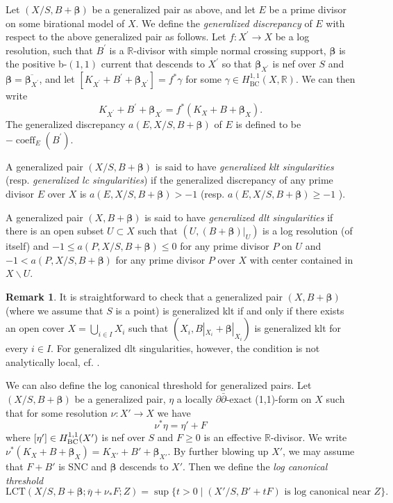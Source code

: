 \documentclass[11pt]{amsart}
\numberwithin{equation}{section}
\def\bbeta{\boldsymbol{\beta}}
\theoremstyle{definition}
\theoremstyle{definition}
\theoremstyle{definition}
\newtheorem{remark}[theorem]{Remark}
\begin{document}
Let $(X{ /S}, B+\bbeta)$ be a generalized pair as above, and let $E$ be a prime divisor on some birational model of $X$. We define the \textit{generalized discrepancy} of $E$ with respect to the above generalized pair as follows. Let $f: X^{\prime} \rightarrow X$ be a log resolution, such that $B^{\prime}$ is a $\mathbb{R}$-divisor with simple normal crossing support, $\boldsymbol{\beta}$ is the positive b-$(1,1)$ current that descends to $X^{\prime}$ so that $\boldsymbol{\beta}_{X^{\prime}}$ is nef over $S$ and $\boldsymbol{\beta}=\overline{\boldsymbol{\beta}_{X^{\prime}}}$, and let $\left[K_{X^{\prime}}+B^{\prime}+\boldsymbol{\beta}_{X^{\prime}}\right]=f^* \gamma$ for some $\gamma \in H_{\mathrm{BC}}^{1,1}(X, \mathbb{R})$. We can then write
$$
K_{X^{\prime}}+B^{\prime}+\boldsymbol{\beta}_{X^{\prime}}=f^*\left(K_X+B+\boldsymbol{\beta}_X\right) .
$$
The generalized discrepancy $a(E,X{/S}, B+ \boldsymbol{\beta})$ of $E$ is defined to be $-\operatorname{coeff}_E\left(B^{\prime}\right)$.

A generalized pair $(X{/S}, B+\bbeta)$ is said to have \textit{generalized klt singularities} (resp. \textit{generalized lc singularities}) if the generalized discrepancy of any prime divisor $E$ over $X$ is $a(E, X{/S}, B+ \boldsymbol{\beta})>-1$ (resp. $a(E, X{/S}, B+ \boldsymbol{\beta}) \geq-1$ ).

A generalized pair $(X, B+\boldsymbol{\beta})$ is said to have \textit{generalized dlt singularities}  if there is an open subset $U \subset X$ such that $\left(U,\left.(B+\bbeta)\right|_U\right)$ is a log resolution (of itself) and $-1 \leq a(P, X{/S}, B+\bbeta) \leq 0$ for any prime divisor $P$ on $U$ and $-1<a(P, X{/S}, B+\bbeta) $ for any prime divisor $P$ over $X$ with center contained in $X \backslash U$.

\begin{remark}
It is straightforward to check that a generalized pair $(X, B + \bbeta)$ (where we assume that $S$ is a point) is generalized klt if and only if there exists an open cover $X = \bigcup_{i \in I} X_i$ such that $(X_i, B|_{X_i} + \bbeta|_{X_i})$ is generalized klt for every $i \in I$. For generalized dlt singularities, however, the condition is not analytically local, cf. \cite[Example~3.11]{Fuj22}.

\end{remark}
We can also define the log canonical threshold for generalized pairs. Let $(X{/S},B+ \boldsymbol{\beta})$ be a generalized pair, $\eta$ a locally $\partial\bar \partial$-exact (1,1)-form on $X$ such that for some resolution
$\nu:X'\to X$ we have $$\nu^* \eta = \eta ' + F$$ where
$[\eta']\in H^{1,1}_{\rm BC}(X')$ is nef over $S$ and $F\ge 0$ is an effective $\mathbb{R}$-divisor.   We write $\nu^*(K_X+B+ \bbeta_X) = K_{X'}+B'+\bbeta_{X'}$. By further blowing up $X'$, we may assume that $F+B'$ is SNC and $\bbeta$ descends to $X'$. Then we define the \textit{log canonical threshold}  $$\text{LCT}(X/S, B + \boldsymbol{ \beta};\overline{\eta}+\nu_*F;Z) = \sup\{t >0 \mid (X' { / S}, B' + t F) \text{ is log canonical near  }Z\}.$$
\end{document}
